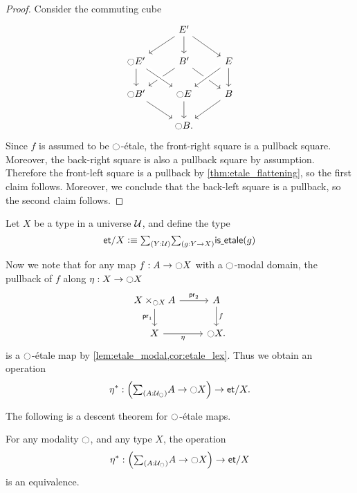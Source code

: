 \documentclass[9pt,twosided]{amsart}
\newcommand{\et}{\mathsf{et}}
\begin{document}
\begin{proof}
  Consider the commuting cube
  \begin{equation*}
    \begin{tikzcd}
      &[-.5ex] E' \arrow[dr] \arrow[d] \arrow[dl] \\
      \modal E' \arrow[d] & B' \arrow[dl] \arrow[dr] & E \arrow[dl,crossing over] \arrow[d] \\
      \modal B' \arrow[dr] & \modal E \arrow[d] \arrow[from=ul,crossing over] & B \arrow[dl] \\
      & \modal B.
    \end{tikzcd}
  \end{equation*}
  Since $f$ is assumed to be ${\ocircle}$-\'etale, the front-right square is a pullback square. Moreover, the back-right square is also a pullback square by assumption. Therefore the front-left square is a pullback by \cref{thm:etale_flattening}, so the first claim follows. Moreover, we conclude that the back-left square is a pullback, so the second claim follows.
\end{proof}

\begin{defn}
  Let $X$ be a type in a universe $\mathcal{U}$, and define the type
  \begin{equation*}
    \et/X\defeq \sm{Y:\UU}{g:Y\to X}\isetale(g)
  \end{equation*}
\end{defn}

Now we note that for any map $f:A\to {\ensuremath{\ocircle}} X$ with a ${\ocircle}$-modal domain, the pullback of $f$ along $\eta:X\to {\ensuremath{\ocircle}} X$
\begin{equation*}
\begin{tikzcd}
X\times_{\modal X}A \arrow[d,swap,"\proj 1"] \arrow[r,"\proj 2"] & A \arrow[d,"f"] \\
X \arrow[r,swap,"\modalunit"] & \modal X.
\end{tikzcd}
\end{equation*}
is a ${\ocircle}$-\'etale map by \cref{lem:etale_modal,cor:etale_lex}. Thus we obtain an operation
\begin{equation*}
  \eta^\ast :\Big(\sm{A:\UU_\modal}A\to\modal X\Big)\to\et/X.
\end{equation*}

The following is a descent theorem for ${\ocircle}$-\'etale maps.

\begin{thm}\label{thm:modal_descent}
For any modality ${\ocircle}$, and any type $X$, the operation
\begin{equation*}
\eta^\ast:\Big(\sm{A:\UU_\modal}A\to\modal X\Big)\to\et/X
\end{equation*}
is an equivalence.
\end{thm}
\end{document}
